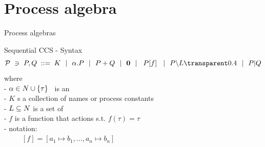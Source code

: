 \documentclass[aspectratio=169]{beamer}
\begin{document}
%
%
%
%
%


\section{Process algebra}

\begin{slide}{Process algebras}
\small

\begin{block}{Sequential CCS - Syntax}
\begin{equation*}
\mathcal{P} ~\ni~ P,Q\; ::=\; K ~~|~~ \alpha.P ~~|~~ P + Q ~~|~~ \cnil
        ~~|~~ \crn P f  ~~|~~ P\backslash L \faded{~~|~~ P|Q}
\end{equation*}
%
where
\\- $\alpha \in \Act %
    \cup \set{\tau}$~ is an 
\\- $K$ s a collection of  names or process constants
\\- $L \subseteq \Act %
    $ is a set of 
\\- $f$ is a function that  actions s.t. $f(\tau) = \tau$ %
\\- \alert{notation:}
\\~~~~~$[f] = [a_1\mapsto b_1,\ldots,a_n \mapsto b_n]$
\end{block}
\end{slide}
\end{document}
